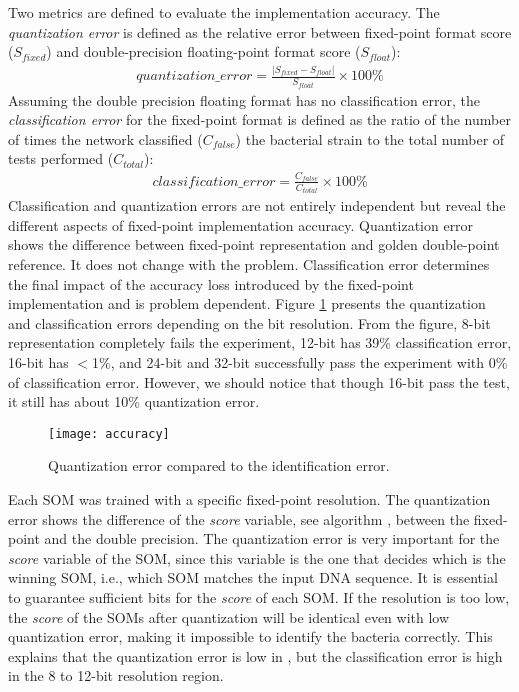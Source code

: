 Two metrics are defined to evaluate the implementation accuracy. The \emph{quantization error} is defined as the relative error between fixed-point format score ($S_{fixed}$) and double-precision floating-point format score ($S_{float}$):
\begin{align*}
	quantization\_error = \frac{|S_{fixed} - S_{float}|}{S_{float}}\times 100\%
\end{align*}
Assuming the double precision floating format has no classification error, the \emph{classification error} for the fixed-point format is defined as the ratio of the number of times the network classified ($C_{false}$) the bacterial strain to the total number of tests performed ($C_{total}$):
\begin{align*}
	classification\_error = \frac{C_{false}}{C_{total}}\times 100\%
\end{align*}
Classification and quantization errors are not entirely independent but reveal the different aspects of fixed-point implementation accuracy. Quantization error shows the difference between fixed-point representation and golden double-point reference. It does not change with the problem. Classification error determines the final impact of the accuracy loss introduced by the fixed-point implementation and is problem dependent. Figure \ref{fig:error} presents the quantization and classification errors depending on the bit resolution. From the figure, 8-bit representation completely fails the experiment, 12-bit has 39\% classification error, 16-bit has $<$1\%, and 24-bit and 32-bit successfully pass the experiment with 0\% of classification error. However, we should notice that though 16-bit pass the test, it still has about 10\% quantization error.\par
\begin{figure}[ht]
	\centering
	\texttt{[image: accuracy]}
	\caption{Quantization error compared to the identification error.}
	\label{fig:error}
\end{figure}
Each SOM was trained with a specific fixed-point resolution. The quantization error shows the difference of the \emph{score} variable, see algorithm , between the fixed-point and the double precision. The quantization error is very important for the \emph{score} variable of the SOM, since this variable is the one that decides which is the winning SOM, i.e., which SOM matches the input DNA sequence. It is essential to guarantee sufficient bits for the \emph{score} of each SOM. If the resolution is too low, the \emph{score} of the SOMs after quantization will be identical even with low quantization error, making it impossible to identify the bacteria correctly. This explains that the quantization error is low in , but the classification error is high in the 8 to 12-bit resolution region.
